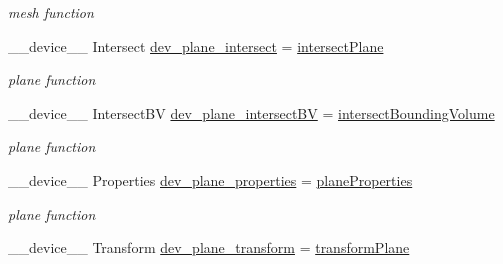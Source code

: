\begin{DoxyCompactItemize}
\begin{DoxyCompactList}\small\item\em mesh function \end{DoxyCompactList}\item 
\+\_\+\+\_\+device\+\_\+\+\_\+ Intersect \hyperlink{group__device__pointers_ga9e46bdfb1fa506ed7f5f6c6e11ebc091}{dev\+\_\+plane\+\_\+intersect} = \hyperlink{group__intersection__test__prperties_gafbcfd99d540347f9f63d01d6d0b6eef5}{intersect\+Plane}\hypertarget{group__device__pointers_ga9e46bdfb1fa506ed7f5f6c6e11ebc091}{}\label{group__device__pointers_ga9e46bdfb1fa506ed7f5f6c6e11ebc091}

\begin{DoxyCompactList}\small\item\em plane function \end{DoxyCompactList}\item 
\+\_\+\+\_\+device\+\_\+\+\_\+ Intersect\+BV \hyperlink{group__device__pointers_gad02954a9c76716ef59d8eda0101e15c7}{dev\+\_\+plane\+\_\+intersect\+BV} = \hyperlink{group__intersection__test__prperties_gaf6bbee9e8a6ee564017fa94cd9e6ec63}{intersect\+Bounding\+Volume}\hypertarget{group__device__pointers_gad02954a9c76716ef59d8eda0101e15c7}{}\label{group__device__pointers_gad02954a9c76716ef59d8eda0101e15c7}

\begin{DoxyCompactList}\small\item\em plane function \end{DoxyCompactList}\item 
\+\_\+\+\_\+device\+\_\+\+\_\+ Properties \hyperlink{group__device__pointers_ga31299a8a293d1f8fd1307f1e47b19b21}{dev\+\_\+plane\+\_\+properties} = \hyperlink{group__intersection__test__prperties_gae25700b3104d615db9d575d086c3d994}{plane\+Properties}\hypertarget{group__device__pointers_ga31299a8a293d1f8fd1307f1e47b19b21}{}\label{group__device__pointers_ga31299a8a293d1f8fd1307f1e47b19b21}

\begin{DoxyCompactList}\small\item\em plane function \end{DoxyCompactList}\item 
\+\_\+\+\_\+device\+\_\+\+\_\+ Transform \hyperlink{group__device__pointers_ga2515bf686c92a25ea08f35a1af5ff5af}{dev\+\_\+plane\+\_\+transform} = \hyperlink{group__intersection__test__prperties_ga6d2ae68047e8f8d11a64b9dc9dda507d}{transform\+Plane}\hypertarget{group__device__pointers_ga2515bf686c92a25ea08f35a1af5ff5af}{}\label{group__device__pointers_ga2515bf686c92a25ea08f35a1af5ff5af}


\end{DoxyCompactItemize}
